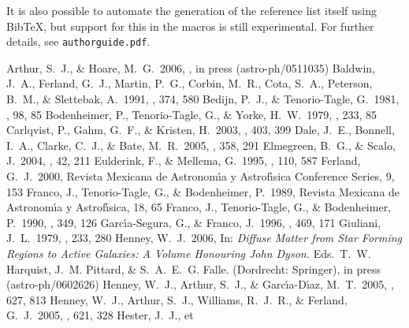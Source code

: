 \documentclass[proceedings, preprint]{rmaa}
\begin{document}
It is also possible to automate the generation of the reference list
itself using BibTeX, but support for this in the macros is still
experimental. For further details, see \texttt{authorguide.pdf}.


\begin{thebibliography}
 Arthur, S.~J., \&
Hoare, M.~G.\ 2006, \apj, in press (astro-ph/0511035)
 Baldwin, J.~A., 
Ferland, G.~J., Martin, P.~G., Corbin, M.~R., Cota, S.~A., Peterson, B.~M., 
\& Slettebak, A.\ 1991, \apj, 374, 580 
 Bedijn, P.~J., 
\& Tenorio-Tagle, G.\ 1981, \aap, 98, 85 
 Bodenheimer, P., 
Tenorio-Tagle, G., \& Yorke, H.~W.\ 1979, \apj, 233, 85 
 Carlqvist, P., Gahm, 
G.~F., \& Kristen, H.\ 2003, \aap, 403, 399 
 Dale, J.~E., Bonnell, 
I.~A., Clarke, C.~J., \& Bate, M.~R.\ 2005, \mnras, 358, 291 
 Elmegreen,
B.~G., \& Scalo, J.\ 2004, \araa, 42, 211 
 Eulderink, F., \& 
Mellema, G.\ 1995, \aaps, 110, 587 
 Ferland, G.~J.\ 2000, Revista 
Mexicana de Astronom\'\i{}a y Astrof\'\i{}sica Conference Series, 9, 153 
 Franco, J., 
Tenorio-Tagle, G., \& Bodenheimer, P.\ 1989, Revista Mexicana de
Astronom\'\i{}a y Astrof\'\i{}sica, 18, 65 
 Franco, J., 
Tenorio-Tagle, G., \& Bodenheimer, P.\ 1990, \apj, 349, 126 
  Garc\'\i a-Segura, G., \& Franco, J.\ 1996, \apj, 469, 171
 Giuliani, J.~L.\ 1979,
\apj, 233, 280 
 Henney, W.~J.\ 2006, In:
  \textit{Diffuse Matter from Star Forming Regions to Active Galaxies:
    A Volume Honouring John Dyson.} Eds.\ T.~W. Harquist,
  J.~M. Pittard, \& S.~A.~E.~G. Falle. (Dordrecht: Springer), in press
  (astro-ph/0602626)
  Henney, W.~J.,
Arthur, S.~J., \& Garc{\'{\i}}a-D{\'{\i}}az, M.~T.\ 2005, \apj, 627, 813 
 Henney, W.~J., Arthur, 
S.~J., Williams, R.~J.~R., \& Ferland, G.~J.\ 2005, \apj, 621, 328 
 Hester, J.~J., et

\end{thebibliography}
\end{document}
